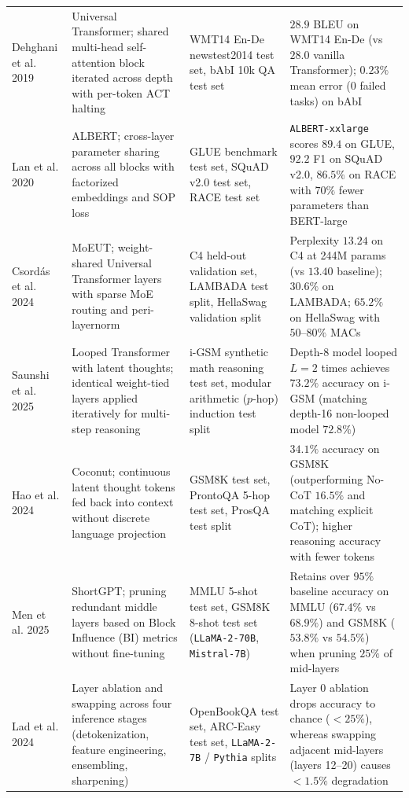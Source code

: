 \documentclass[11pt]{article}
\begin{document}
\begin{table}[h!]
\begin{tabularx}{\textwidth}{@{}p{2.2cm}p{3.8cm}X p{3.8cm}@{}}
Dehghani et al. 2019 \cite{dehghani2019universal} & Universal Transformer; shared multi-head self-attention block iterated across depth with per-token ACT halting & WMT14 En-De newstest2014 test set, bAbI 10k QA test set & $28.9$ BLEU on WMT14 En-De (vs $28.0$ vanilla Transformer); $0.23\%$ mean error (0 failed tasks) on bAbI\\
Lan et al. 2020 \cite{lan2020albert} & ALBERT; cross-layer parameter sharing across all blocks with factorized embeddings and SOP loss & GLUE benchmark test set, SQuAD v2.0 test set, RACE test set & \texttt{ALBERT-xxlarge} scores $89.4$ on GLUE, $92.2$ F1 on SQuAD v2.0, $86.5\%$ on RACE with $70\%$ fewer parameters than BERT-large\\
Csord{\'a}s et al. 2024 \cite{csordas2024moeut} & MoEUT; weight-shared Universal Transformer layers with sparse MoE routing and peri-layernorm & C4 held-out validation set, LAMBADA test split, HellaSwag validation split & Perplexity $13.24$ on C4 at 244M params (vs $13.40$ baseline); $30.6\%$ on LAMBADA; $65.2\%$ on HellaSwag with $50\text{--}80\%$ MACs\\
Saunshi et al. 2025 \cite{saunshi2025reasoning} & Looped Transformer with latent thoughts; identical weight-tied layers applied iteratively for multi-step reasoning & i-GSM synthetic math reasoning test set, modular arithmetic ($p$-hop) induction test split & Depth-8 model looped $L=2$ times achieves $73.2\%$ accuracy on i-GSM (matching depth-16 non-looped model $72.8\%$)\\
Hao et al. 2024 \cite{hao2024training} & Coconut; continuous latent thought tokens fed back into context without discrete language projection & GSM8K test set, ProntoQA 5-hop test set, ProsQA test split & $34.1\%$ accuracy on GSM8K (outperforming No-CoT $16.5\%$ and matching explicit CoT); higher reasoning accuracy with fewer tokens\\
Men et al. 2025 \cite{men2025shortgpt} & ShortGPT; pruning redundant middle layers based on Block Influence (BI) metrics without fine-tuning & MMLU 5-shot test set, GSM8K 8-shot test set (\texttt{LLaMA-2-70B}, \texttt{Mistral-7B}) & Retains over $95\%$ baseline accuracy on MMLU ($67.4\%$ vs $68.9\%$) and GSM8K ($53.8\%$ vs $54.5\%$) when pruning $25\%$ of mid-layers\\
Lad et al. 2024 \cite{lad2024remarkable} & Layer ablation and swapping across four inference stages (detokenization, feature engineering, ensembling, sharpening) & OpenBookQA test set, ARC-Easy test set, \texttt{LLaMA-2-7B} / \texttt{Pythia} splits & Layer 0 ablation drops accuracy to chance ($<25\%$), whereas swapping adjacent mid-layers (layers 12--20) causes $<1.5\%$ degradation\\

\end{tabularx}
\end{table}
\end{document}
